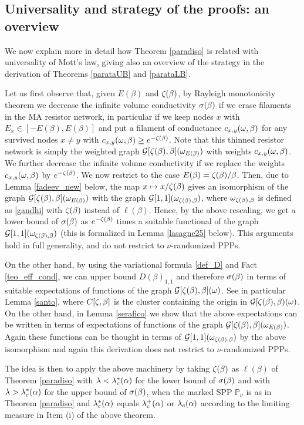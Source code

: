 \documentclass[12pt,a4paper,reqno]{amsart}
\newcommand{\cG}{\ensuremath{\mathcal G}}
\newcommand{\bbP}{{\ensuremath{\mathbb P}} }
\let\a=\alpha \let\b=\beta   \let\d=\delta  \let\e=\varepsilon
\newcommand{\orc}{\textcolor{black}} %
\begin{document}
\subsection{Universality and strategy of the proofs: an overview}\label{lachiave}
 We now  explain more in detail how   Theorem \ref{paradiso} is related with universality of Mott's law, giving also an overview of the strategy in the derivation of Theorems \ref{parataUB} and \ref{parataLB}. 
 
 Let us first observe  that, given $E(\b)$ and $\z(\b)$, by Rayleigh monotonicity theorem we decrease the infinite volume conductivity $\s (\b) $ if we erase filaments in the MA resistor network,   in particular if we keep nodes $x$ with $E_x\in [-E(\b),E(\b)]$  and put a filament of conductance $c_{x,y}(\o,\b)$  for any survived nodes $x\not =y$ with  $c_{x,y}(\o,\b) \geq e^{-\z(\b)}$.   Note that 
  this thinned  resistor network is simply the weighted graph $\cG[\z(\b), \b] (\o _{E(\b)})$ with  weights  $c_{x,y}(\o,\b)$. We further decrease the infinite volume conductivity if we  replace the weights $c_{x,y}(\o,\b)$ by $e^{-\z(\b)}$.  We now restrict to the case $E(\b)=\z(\b)/\b$. Then, due to \orc{Lemma} \ref{fadeev_new} below,  the map $x\mapsto x/\z(\b)$ gives an isomorphism of the graph $\cG[\z(\b), \b] (\o _{E(\b) })$ with the graph $\cG[1,1](\o_{\z(\b), \b})$, where $\o_{\z(\b), \b}$ is defined as \eqref{gandhi} with $\z(\b)$ instead of $\ell(\b)$. Hence, by the above rescaling, we get a lower bound of $\s(\b)$ as  $e^{-\z(\b)}$ times a suitable functional of the graph $\cG[1,1](\o_{\z(\b), \b})$ (this is formalized in Lemma \ref{lasagne25} below).  This arguments hold in full generality, and do not restrict to $\nu$-randomized PPPs. 
  
  On the other hand, by using the variational formula \eqref{def_D} and Fact \ref{teo_eff_cond}, we can upper bound $D(\b)_{1,1}$ and therefore $\s(\b)$ in terms of  suitable expectations of  functions of the graph $\cG[\z(\b), \b] (\o)  $. See in particular Lemma \ref{santo}, where $C[\z,\b]$ is the cluster containing the origin in $\cG[\z(\b),\b) (\o)$. On the other hand, in Lemma \ref{serafico} we show that the above expectations can be written in terms of expectations of  functions of the graph $\cG[\z(\b), \b] (\o_{E(\b)})$.  Again these functions can be thought in terms of  $\cG[1,1](\o_{\z(\b), \b})$ by the above isomorphism and 
  again this derivation does not restrict to $\nu$-randomized PPPs. 
  

  The idea is then to apply the above machinery by taking $\z(\b)$ as $\ell(\b)$ of Theorem \ref{paradiso} with $\l <\l_c^*(\a)$ for the lower bound of $\s(\b)$ and with $\l>\l^*_c(\a)$ for the upper bound of $\s(\b)$, when the marked SPP $\bbP_\nu$  is as in Theorem \ref{paradiso} and $\l^*_c(\a)$ equals $\l^+_c(\a)$ or $\l_c(\a)$
 according to the limiting measure in Item (i) of the above theorem. 
  
\end{document}
